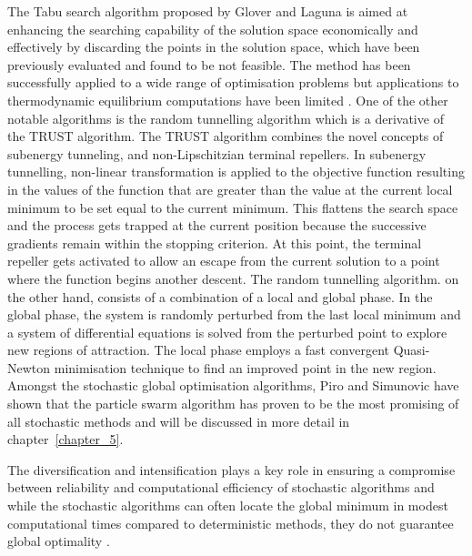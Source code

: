 	The Tabu search algorithm proposed by Glover and Laguna \cite{Glover:1993aa} is aimed at enhancing the searching capability of the solution space economically and effectively by discarding the points in the solution space, which have been previously evaluated and found to be not feasible. The method has been successfully applied to a wide range of optimisation problems but  applications to thermodynamic equilibrium computations have been limited \cite{SRINIVAS2007760,Teh03}. One of the other notable algorithms is the random tunnelling algorithm which is a derivative of the TRUST algorithm. The TRUST algorithm \cite{Barhen97} combines the novel concepts of subenergy tunneling, and non-Lipschitzian terminal repellers. In subenergy tunnelling, non-linear transformation is applied to the objective function resulting in the values of the function that are greater than the value at the current local minimum to be set equal to the current minimum. This flattens the search space and the process gets trapped at the current position because the successive gradients remain within the stopping criterion. At this point, the terminal repeller gets activated to allow an escape from the current solution to a point where the function begins another descent. The random tunnelling algorithm. on the other hand, consists of a combination of a local and global phase. In the global phase, the system is randomly perturbed from the last local minimum and a system of differential equations is solved from the perturbed point to explore new regions of attraction. The local phase employs a fast convergent Quasi-Newton minimisation technique to find an improved point in the new region. Amongst the stochastic global optimisation algorithms, Piro and Simunovic \cite{Piro16} have shown that the particle swarm algorithm has proven to be the most promising of all stochastic methods and will be discussed in more detail in chapter~\ref{chapter_5}.

	The diversification and intensification plays a key role in ensuring a compromise between reliability and computational efficiency of stochastic algorithms and while the stochastic algorithms can often locate the global minimum in modest computational times compared to deterministic methods, they do not guarantee global optimality \cite{Zhang11,Blum:2003aa}.

